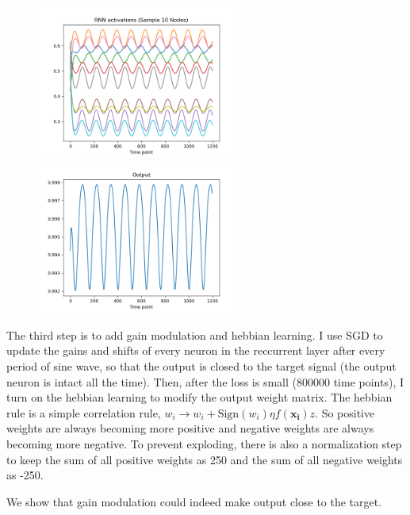 \documentclass[12pt, a4paper]{article}
\begin{document}
\begin{figure}[H]
    \centering
    \includegraphics[width=0.6\textwidth]{RNN/FORCE/fig/FORCE_fbtarget_activations.png} \\
    \includegraphics[width=0.6\textwidth]{RNN/FORCE/fig/FORCE_fbtarget_output.png} \\
\end{figure}

The third step is to add gain modulation and hebbian learning. I use SGD to update the gains and shifts of every neuron in the reccurrent layer after every period of sine wave, so that the output is closed to the target signal (the output neuron is intact all the time). Then, after the loss is small (800000 time points), I turn on the hebbian learning to modify the output weight matrix. The hebbian rule is a simple correlation rule, $w_{i} \rightarrow w_{i} + \text{Sign}(w_i) \eta f(\mathbf{x_i}) z$. So positive weights are always becoming more positive and negative weights are always becoming more negative. To prevent exploding, there is also a normalization step to keep the sum of all positive weights as 250 and the sum of all negative weights as -250.

We show that gain modulation could indeed make output close to the target.
\end{document}

